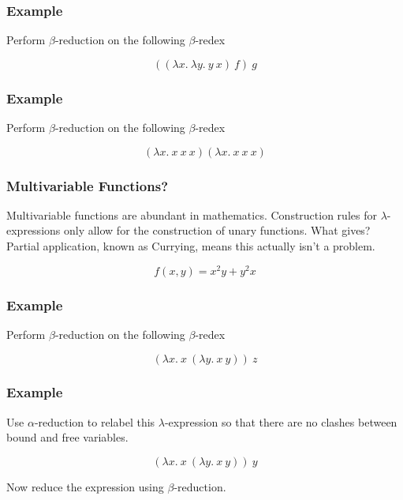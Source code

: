 \documentclass{beamer}
\begin{document}
\begin{frame}
	\frametitle{Example}

	Perform $\beta$-reduction on the following $\beta$-redex

	$$((\lambda x. \ \lambda y. \ y \ x) \ f) \ g $$

	\vspace{6cm}


\end{frame}


\begin{frame}
	\frametitle{Example}

	Perform $\beta$-reduction on the following $\beta$-redex

	$$(\lambda x. \ x \ x \ x)(\lambda x. \ x \ x \ x)$$

	\vspace{6cm}


\end{frame}

\begin{frame}
	\frametitle{Multivariable Functions?}

	Multivariable functions are abundant in mathematics. Construction rules for $\lambda$-expressions only allow for the construction of unary functions. What gives? Partial application, known as Currying, means this actually isn't a problem.

	$$f(x,y) = x^{2}y + y^{2}x$$

	\vspace{4cm}

\end{frame}

\begin{frame}
	\frametitle{Example}

	Perform $\beta$-reduction on the following $\beta$-redex

	$$(\lambda x. \ x \ (\lambda y. \ x \ y)) \ z$$

	\vspace{6cm}	
	
\end{frame}

\begin{frame}
	\frametitle{Example}

	Use $\alpha$-reduction to relabel this $\lambda$-expression so that there are no clashes between bound and free variables. 

	$$(\lambda x. \ x \ (\lambda y. \ x \ y)) \ y$$

	\vspace{2cm}

	Now reduce the expression using $\beta$-reduction.

	\vspace{2cm}
	
	
\end{frame}
\end{document}
